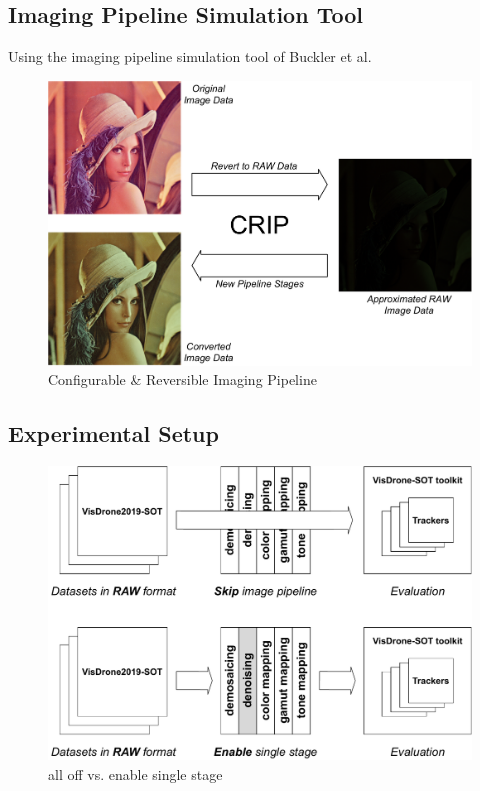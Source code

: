 \documentclass{beamer}
\begin{document}
\subsection{Imaging Pipeline Simulation Tool}

\begin{frame}

    Using the imaging pipeline simulation tool of Buckler et al.
    
    \begin{figure}[htpb]
        \begin{center}
            \includegraphics[width=0.65\linewidth]{fig/crip.pdf}
            \caption{Configurable \& Reversible Imaging Pipeline}
        \end{center}
    \end{figure}
\end{frame}

\subsection{Experimental Setup}

\begin{frame}
    \begin{figure}[htpb]
        \begin{center}
            \includegraphics[width=0.8\linewidth]{fig/eva.pdf}
            \caption{all off vs. enable single stage}
        \end{center}
    \end{figure}
\end{frame}
\end{document}
